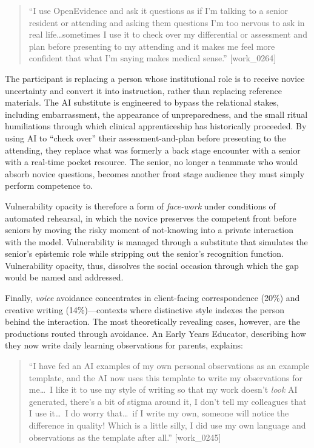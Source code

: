 \documentclass[pdflatex,sn-basic]{sn-jnl}%
\theoremstyle{thmstyleone}%
\theoremstyle{thmstyletwo}%
\theoremstyle{thmstylethree}%
\begin{document}
\begin{quote}
``I use OpenEvidence and ask it questions as if I'm talking to a senior resident or attending and asking them questions I'm too nervous to ask in real life\ldots sometimes I use it to check over my differential or assessment and plan before presenting to my attending and it makes me feel more confident that what I'm saying makes medical sense.'' [work\_0264]
\end{quote}

The participant is replacing a person whose institutional role is to receive novice uncertainty and convert it into instruction, rather than replacing reference materials. The AI substitute is engineered to bypass the relational stakes, including embarrassment, the appearance of unpreparedness, and the small ritual humiliations through which clinical apprenticeship has historically proceeded. By using AI to ``check over'' their assessment-and-plan before presenting to the attending, they replace what was formerly a back stage encounter with a senior with a real-time pocket resource. The senior, no longer a teammate who would absorb novice questions, becomes another front stage audience they must simply perform competence to.

Vulnerability opacity is therefore a form of \textit{face-work} under conditions of automated rehearsal, in which the novice preserves the competent front before seniors by moving the risky moment of not-knowing into a private interaction with the model. Vulnerability is managed through a substitute that simulates the senior's epistemic role while stripping out the senior's recognition function. Vulnerability opacity, thus, dissolves the social occasion through which the gap would be named and addressed.

Finally, \textit{voice} avoidance concentrates in client-facing correspondence (20\%) and creative writing (14\%)---contexts where distinctive style indexes the person behind the interaction. The most theoretically revealing cases, however, are the productions routed through avoidance. An Early Years Educator, describing how they now write daily learning observations for parents, explains:

\begin{quote}
``I have fed an AI examples of my own personal observations as an example template, and the AI now uses this template to write my observations for me\ldots\ I like it to use my style of writing so that my work doesn't \textit{look} AI generated, there's a bit of stigma around it, I don't tell my colleagues that I use it\ldots\ I do worry that\ldots\ if I write my own, someone will notice the difference in quality! Which is a little silly, I did use my own language and observations as the template after all.'' [work\_0245]
\end{quote}
\end{document}
